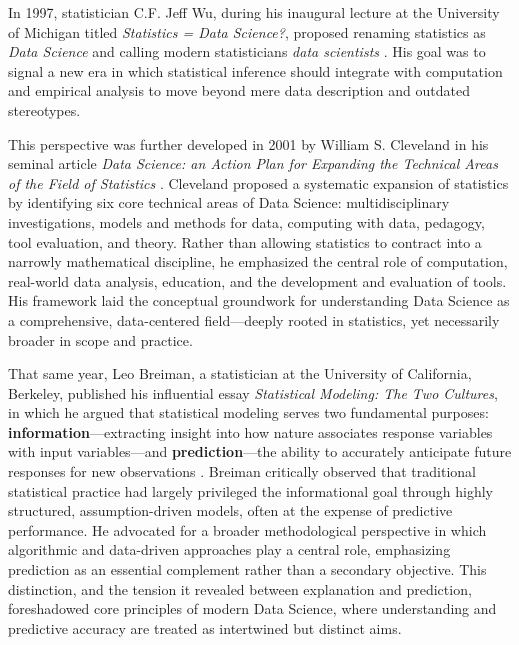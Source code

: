 \documentclass[
  12pt,
  letterpaper,
]{book}
\begin{document}
In 1997, statistician C.F. Jeff Wu, during his inaugural lecture at the
University of Michigan titled \emph{Statistics = Data Science?},
proposed renaming statistics as \emph{Data Science} and calling modern
statisticians \emph{data scientists}
. His goal was to signal a new
era in which statistical inference should integrate with computation and
empirical analysis to move beyond mere data description and outdated
stereotypes.

This perspective was further developed in 2001 by William S. Cleveland
in his seminal article \emph{Data Science: an Action Plan for Expanding
the Technical Areas of the Field of Statistics}
. Cleveland proposed a
systematic expansion of statistics by identifying six core technical
areas of Data Science: multidisciplinary investigations, models and
methods for data, computing with data, pedagogy, tool evaluation, and
theory. Rather than allowing statistics to contract into a narrowly
mathematical discipline, he emphasized the central role of computation,
real-world data analysis, education, and the development and evaluation
of tools. His framework laid the conceptual groundwork for understanding
Data Science as a comprehensive, data-centered field---deeply rooted in
statistics, yet necessarily broader in scope and practice.

That same year, Leo Breiman, a statistician at the University of
California, Berkeley, published his influential essay \emph{Statistical
Modeling: The Two Cultures}, in which he argued that statistical
modeling serves two fundamental purposes:
\textbf{information}---extracting insight into how nature associates
response variables with input variables---and \textbf{prediction}---the
ability to accurately anticipate future responses for new observations
. Breiman critically
observed that traditional statistical practice had largely privileged
the informational goal through highly structured, assumption-driven
models, often at the expense of predictive performance. He advocated for
a broader methodological perspective in which algorithmic and
data-driven approaches play a central role, emphasizing prediction as an
essential complement rather than a secondary objective. This
distinction, and the tension it revealed between explanation and
prediction, foreshadowed core principles of modern Data Science, where
understanding and predictive accuracy are treated as intertwined but
distinct aims.
\end{document}
